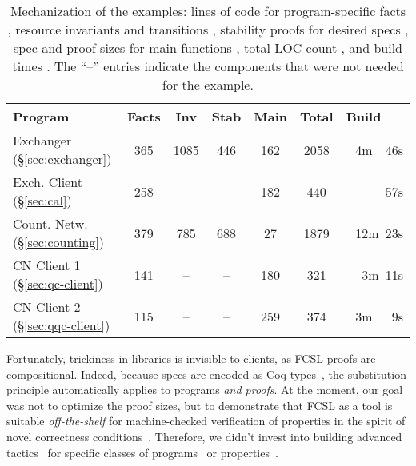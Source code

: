 {
\begin{table}
{%
\sffamily\small %
\centering
\begin{tabular}{|@{\ }l@{\ }||@{\ }c@{\ }|@{\ }c@{\ }|@{\ }c@{\ }|@{\ }c@{\ }|@{\ }c@{\ }||@{\ }r@{\ }|}
  \hline
  \textbf{Program} &  
                     {Facts} & {Inv} &
                                       {Stab} & {Main} & \textbf{Total}
  & \textbf{Build~~~}    
  \\ \hline \hline 
  Exchanger \hfill (\S \ref{sec:exchanger}) & 365 & 1085 & 446 & 162 & 2058 & 4m~~46s
  \\
  Exch. Client \hfill (\S \ref{sec:cal}) & 258 & -- &--& 182 & 440 & 57s
  \\
  Count. Netw. \hfill (\S \ref{sec:counting}) & 379 & 785 & 688 & 27 & 1879 & 12m~23s
  \\
  CN Client 1 \hfill (\S \ref{sec:qc-client}) & 141 &--&--& 180  & 321 & 3m~11s
  \\
  CN Client 2 \hfill (\S \ref{sec:qqc-client})& 115 &--&--& 259 & 374 & 3m~~~9s 
  \\[2pt] \hline
\end{tabular}
}
\caption{
  Mechanization of the examples: lines of code for program-specific facts ,
  resource invariants and transitions , 
  stability proofs for desired specs , spec and proof sizes for main
  functions , total LOC count , and build
  times . The ``--'' entries indicate the
  components that were not needed for the example.
} 
\label{tab:locs}
\end{table}}

Fortunately, trickiness in libraries is invisible to clients, as FCSL
proofs are compositional. Indeed, because specs are encoded as Coq
types~\cite{Sergey-al:PLDI15}, the substitution principle
automatically applies to programs \emph{and proofs}.
%
%
At the moment, our goal was not to optimize the proof sizes, but to
demonstrate that FCSL as a tool is suitable \emph{off-the-shelf} for
machine-checked verification of properties in the spirit of novel
correctness
conditions~\cite{Hemed-al:DISC15,Aspnes-al:JACM94,Jagadeesan-Riely:ICALP14}.
Therefore, we didn't invest into building advanced
tactics~\cite{McCreight:TPHOL09} for specific classes of
programs~\cite{Zee-al:PLDI08} or
properties~\cite{Dragoi-al:CAV13,Vafeiadis:CAV10,Bouajjani-al:POPL15}.
%


